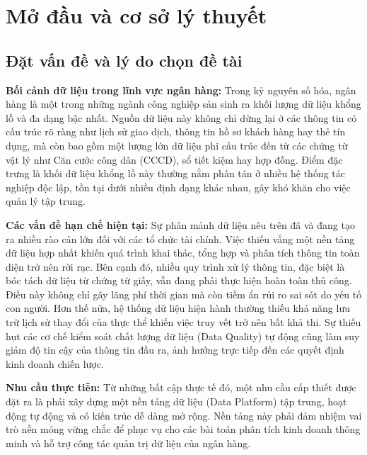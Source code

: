 \chapter{Mở đầu và cơ sở lý thuyết}
\label{ch:intro}

\section{Đặt vấn đề và lý do chọn đề tài}

\textbf{Bối cảnh dữ liệu trong lĩnh vực ngân hàng:} 
Trong kỷ nguyên số hóa, ngân hàng là một trong những ngành công nghiệp sản sinh ra khối lượng dữ liệu khổng lồ và đa dạng bậc nhất. Nguồn dữ liệu này không chỉ dừng lại ở các thông tin có cấu trúc rõ ràng như lịch sử giao dịch, thông tin hồ sơ khách hàng hay thẻ tín dụng, mà còn bao gồm một lượng lớn dữ liệu phi cấu trúc đến từ các chứng từ vật lý như Căn cước công dân (CCCD), sổ tiết kiệm hay hợp đồng. Điểm đặc trưng là khối dữ liệu khổng lồ này thường nằm phân tán ở nhiều hệ thống tác nghiệp độc lập, tồn tại dưới nhiều định dạng khác nhau, gây khó khăn cho việc quản lý tập trung.

\textbf{Các vấn đề hạn chế hiện tại:} 
Sự phân mảnh dữ liệu nêu trên đã và đang tạo ra nhiều rào cản lớn đối với các tổ chức tài chính. Việc thiếu vắng một nền tảng dữ liệu hợp nhất khiến quá trình khai thác, tổng hợp và phân tích thông tin toàn diện trở nên rời rạc. Bên cạnh đó, nhiều quy trình xử lý thông tin, đặc biệt là bóc tách dữ liệu từ chứng từ giấy, vẫn đang phải thực hiện hoàn toàn thủ công. Điều này không chỉ gây lãng phí thời gian mà còn tiềm ẩn rủi ro sai sót do yếu tố con người. Hơn thế nữa, hệ thống dữ liệu hiện hành thường thiếu khả năng lưu trữ lịch sử thay đổi của thực thể khiến việc truy vết trở nên bất khả thi. Sự thiếu hụt các cơ chế kiểm soát chất lượng dữ liệu (Data Quality) tự động cũng làm suy giảm độ tin cậy của thông tin đầu ra, ảnh hưởng trực tiếp đến các quyết định kinh doanh chiến lược.

\textbf{Nhu cầu thực tiễn:} 
Từ những bất cập thực tế đó, một nhu cầu cấp thiết được đặt ra là phải xây dựng một nền tảng dữ liệu (Data Platform) tập trung, hoạt động tự động và có kiến trúc dễ dàng mở rộng. Nền tảng này phải đảm nhiệm vai trò nền móng vững chắc để phục vụ cho các bài toán phân tích kinh doanh thông minh và hỗ trợ công tác quản trị dữ liệu của ngân hàng.

